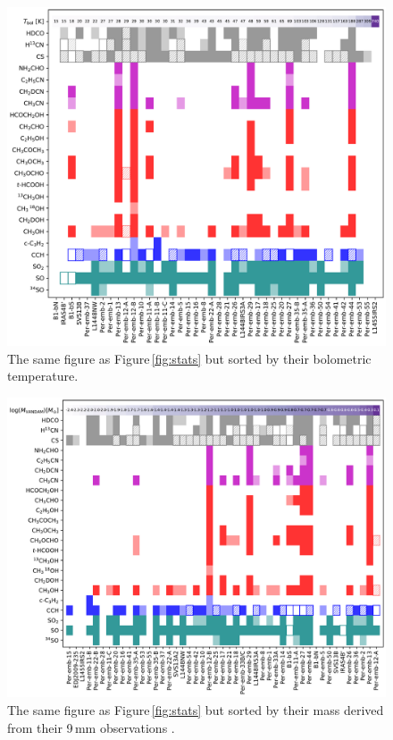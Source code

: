 \documentclass[twocolumn]{aastex62}
\begin{document}
\renewcommand{\thefigure}{\arabic{figure} (Cont.)}
\addtocounter{figure}{-1}
\begin{figure}[htbp!]
  \includegraphics[width=\textwidth]{stats_sorted_by_tbol.pdf}
  \caption{The same figure as Figure\,\ref{fig:stats} but sorted by their bolometric temperature.}
\end{figure}
\addtocounter{figure}{-1}

\begin{figure}[htbp!]
  \includegraphics[width=\textwidth]{stats_sorted_by_Mcont.pdf}
  \caption{The same figure as Figure\,\ref{fig:stats} but sorted by their mass derived from their 9\,mm observations \citep{2018ApJS..238...19T}.}
\end{figure}
\renewcommand{\thefigure}{\arabic{figure}}
\end{document}

